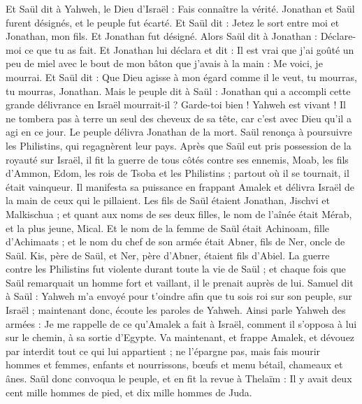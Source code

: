 \begin{multicols}{2}
Et Saül dit à Yahweh, le Dieu d'Israël : Fais connaître la vérité. Jonathan et Saül furent désignés, et le peuple fut écarté.
Et Saül dit : Jetez le sort entre moi et Jonathan, mon fils. Et Jonathan fut désigné.
Alors Saül dit à Jonathan : Déclare-moi ce que tu as fait. Et Jonathan lui déclara et dit : Il est vrai que j'ai goûté un peu de miel avec le bout de mon bâton que j'avais à la main : Me voici, je mourrai.
Et Saül dit : Que Dieu agisse à mon égard comme il le veut, tu mourras, tu mourras, Jonathan.
Mais le peuple dit à Saül : Jonathan qui a accompli cette grande délivrance en Israël mourrait-il ? Garde-toi bien ! Yahweh est vivant ! Il ne tombera pas à terre un seul des cheveux de sa tête, car c'est avec Dieu qu'il a agi en ce jour. Le peuple délivra Jonathan de la mort.
Saül renonça à poursuivre les Philistins, qui regagnèrent leur pays.
Après que Saül eut pris possession de la royauté sur Israël, il fit la guerre de tous côtés contre ses ennemis, Moab, les fils d'Ammon, Edom, les rois de Tsoba et les Philistins ; partout où il se tournait, il était vainqueur.
Il manifesta sa puissance en frappant Amalek et délivra Israël de la main de ceux qui le pillaient.
Les fils de Saül étaient Jonathan, Jischvi et Malkischua ; et quant aux noms de ses deux filles, le nom de l'aînée était Mérab, et la plus jeune, Mical.
Et le nom de la femme de Saül était Achinoam, fille d'Achimaats ; et le nom du chef de son armée était Abner, fils de Ner, oncle de Saül.
Kis, père de Saül, et Ner, père d'Abner, étaient fils d'Abiel.
La guerre contre les Philistins fut violente durant toute la vie de Saül ; et chaque fois que Saül remarquait un homme fort et vaillant, il le prenait auprès de lui.
\VerseOne{}Samuel dit à Saül : Yahweh m'a envoyé pour t'oindre afin que tu sois roi sur son peuple, sur Israël ; maintenant donc, écoute les paroles de Yahweh.
Ainsi parle Yahweh des armées : Je me rappelle de ce qu'Amalek a fait à Israël, comment il s'opposa à lui sur le chemin, à sa sortie d'Egypte.
Va maintenant, et frappe Amalek, et dévouez par interdit tout ce qui lui appartient ; ne l'épargne pas, mais fais mourir hommes et femmes, enfants et nourrissons, bœufs et menu bétail, chameaux et ânes.
Saül donc convoqua le peuple, et en fit la revue à Thelaïm : Il y avait deux cent mille hommes de pied, et dix mille hommes de Juda.

\end{multicols}

